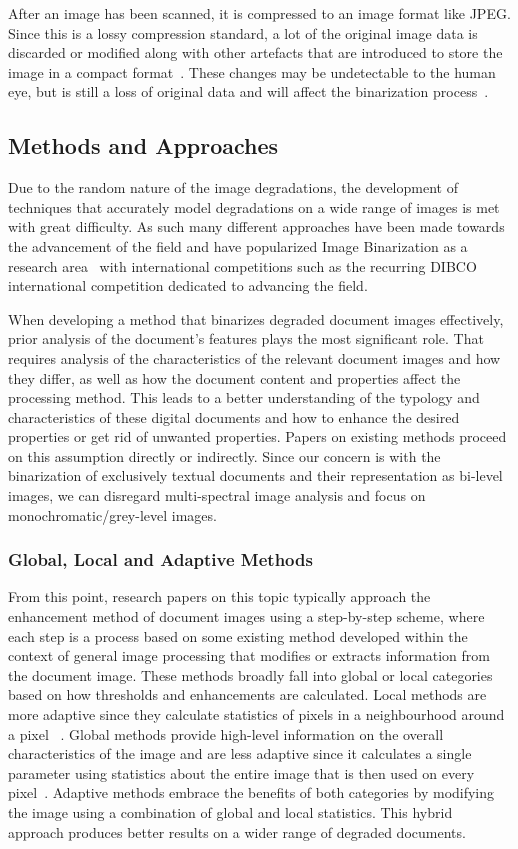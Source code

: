\documentclass[a4paper, 12pt]{report}
\begin{document}
After an image has been scanned, it is compressed to an image format like JPEG. Since this is a lossy compression standard, a lot of the original image data is discarded or modified along with other artefacts that are introduced to store the image in a compact format~\cite{eskenazi2016stability}. These changes may be undetectable to the human eye, but is still a loss of original data and will affect the binarization process~\cite{Baird2007}.

\subsection{Methods and Approaches}
Due to the random nature of the image degradations, the development of techniques that accurately model degradations on a wide range of images is met with great difficulty. As such many different approaches have been made towards the advancement of the field and have popularized Image Binarization as a research area~\cite{ait2022innovative} with international competitions such as the recurring DIBCO international competition dedicated to advancing the field. \par

When developing a method that binarizes degraded document images effectively, prior analysis of the document's features plays the most significant role. That requires analysis of the characteristics of the relevant document images and how they differ, as well as how the document content and properties affect the processing method. This leads to a better understanding of the typology and characteristics of these digital documents and how to enhance the desired properties or get rid of unwanted properties. Papers on existing methods proceed on this assumption directly or indirectly. Since our concern is with the binarization of exclusively textual documents and their representation as bi-level images, we can disregard multi-spectral image analysis and focus on monochromatic/grey-level images.

\subsubsection{Global, Local and Adaptive Methods}
From this point, research papers on this topic typically approach the enhancement method of document images using a step-by-step scheme, where each step is a process based on some existing method developed within the context of general image processing that modifies or extracts information from the document image. These methods broadly fall into global or local categories based on how thresholds and enhancements are calculated. Local methods are more adaptive since they calculate statistics of pixels in a neighbourhood around a pixel ~\cite{gatos2006adaptive}. Global methods provide high-level information on the overall characteristics of the image and are less adaptive since it calculates a single parameter using statistics about the entire image that is then used on every pixel~\cite{gatos2006adaptive}. Adaptive methods embrace the benefits of both categories by modifying the image using a combination of global and local statistics. This hybrid approach produces better results on a wider range of degraded documents.
\end{document}

